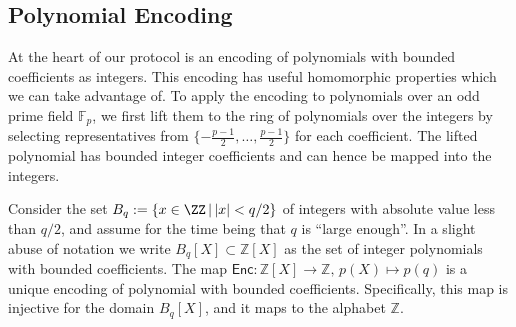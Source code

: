 \documentclass{article}
\theoremstyle{definition}
\begin{document}
\subsection{Polynomial Encoding}
At the heart of our protocol is an encoding of polynomials with bounded coefficients as integers. This encoding has useful homomorphic properties which we can take advantage of. To apply the encoding to polynomials over an odd prime field $\mathbb{F}_p$, we first lift them to the ring of polynomials over the integers by selecting representatives from $\{-\frac{p-1}{2}, \ldots, \frac{p-1}{2}\}$ for each coefficient. The lifted polynomial has bounded integer coefficients and can hence be mapped into the integers.

Consider the set $B_{q}:=\{x \in \ZZ \, | \, \vert x \vert  <q/2\}$ of integers with absolute value less than $q/2$, and assume for the time being that $q$ is ``large enough''. In a slight abuse of notation we write $B_{q}[X]\subset \mathbb{Z}[X]$ as the set of integer polynomials with bounded coefficients. The map $\mathsf{Enc} : \mathbb{Z}[X] \rightarrow \mathbb{Z}, \, p(X) \mapsto p(q)$ is a unique encoding of polynomial with bounded coefficients. Specifically, this map is injective for the domain $B_{q}[X]$, and it maps to the alphabet $\mathbb{Z}$. 
\end{document}

